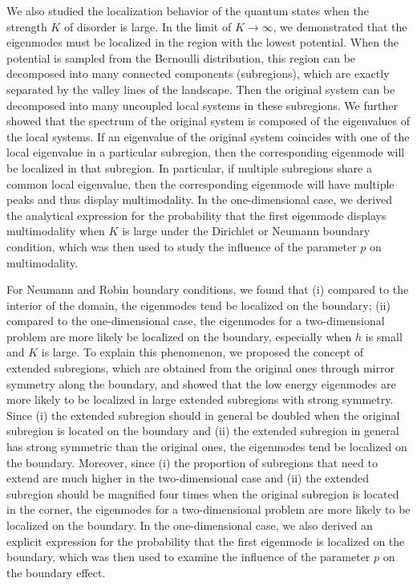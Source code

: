 \documentclass[a4paper,11pt]{article}
\begin{document}
We also studied the localization behavior of the quantum states when the strength $K$ of disorder is large. In the limit of $K\rightarrow\infty$, we demonstrated that the eigenmodes must be localized in the region with the lowest potential. When the potential is sampled from the Bernoulli distribution, this region can be decomposed into many connected components (subregions), which are exactly separated by the valley lines of the landscape. Then the original system can be decomposed into many uncoupled local systems in these subregions. We further showed that the spectrum of the original system is composed of the eigenvalues of the local systems. If an eigenvalue of the original system coincides with one of the local eigenvalue in a particular subregion, then the corresponding eigenmode will be localized in that subregion. In particular, if multiple subregions share a common local eigenvalue, then the corresponding eigenmode will have multiple peaks and thus display multimodality. In the one-dimensional case, we derived the analytical expression for the probability that the first eigenmode displays multimodality when $K$ is large under the Dirichlet or Neumann boundary condition, which was then used to study the influence of the parameter $p$ on multimodality.

For Neumann and Robin boundary conditions, we found that (i) compared to the interior of the domain, the eigenmodes tend be localized on the boundary; (ii) compared to the one-dimensional case, the eigenmodes for a two-dimensional problem are more likely be localized on the boundary, especially when $h$ is small and $K$ is large. To explain this phenomenon, we proposed the concept of extended subregions, which are obtained from the original ones through mirror symmetry along the boundary, and showed that the low energy eigenmodes are more likely to be localized in large extended subregions with strong symmetry. Since (i) the extended subregion should in general be doubled when the original subregion is located on the boundary and (ii) the extended subregion in general has strong symmetric than the original ones, the eigenmodes tend be localized on the boundary. Moreover, since (i) the proportion of subregions that need to extend are much higher in the two-dimensional case and (ii) the extended subregion should be magnified four times when the original subregion is located in the corner, the eigenmodes for a two-dimensional problem are more likely to be localized on the boundary. In the one-dimensional case, we also derived an explicit expression for the probability that the first eigenmode is localized on the boundary, which was then used to examine the influence of the parameter $p$ on the boundary effect.
\end{document}
